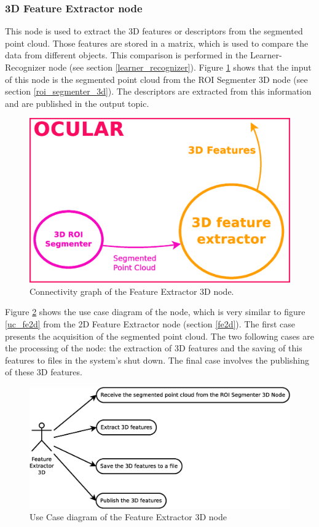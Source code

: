 \subsubsection{3D Feature Extractor node}
\label{fe3d}
	This node is used to extract the 3D features or descriptors from the segmented point cloud. 
	Those features are stored in a matrix, which is used to compare the data from different objects. 
	This comparison is performed in the Learner-Recognizer node (see section \ref{learner_recognizer}).
	Figure \ref{node_fe3d} shows that the input of this node is the segmented point cloud from the ROI Segmenter 3D node (see section \ref{roi_segmenter_3d}). The descriptors are extracted from this information and are published in the output topic. 
	\\
	\vspace{0.5cm}
	\begin{figure}[H]
			\begin{center}
			\includegraphics[width=0.5\linewidth]{img/diagrams/node_fe3d.eps}
			\caption[Feature Extractor 3D node I/O]{Connectivity graph of the Feature Extractor 3D node.}		
			\label{node_fe3d}
			\end{center}
		\end{figure}

	Figure \ref{uc_fe3d} shows the use case diagram of the node, which is very similar to figure \ref{uc_fe2d} from the 2D Feature Extractor node (section \ref{fe2d}). 
	The first case presents the acquisition of the segmented point cloud. 
	The two following cases are the processing of the node: the extraction of 3D features and the saving of this features to files in the system's shut down. 
	The final case involves the publishing of these 3D features. 

\newpage
\vspace{0.5cm}


	\begin{figure}[H]
		\centering
			\includegraphics[scale=0.4]{img/diagrams/uc_feature_extractor_3d.eps}
			\caption[Use case diagram Feature Extractor 3D node]{Use Case diagram of the Feature Extractor 3D node}
		\label{uc_fe3d}
	\end{figure}
\vspace{0.5cm}


